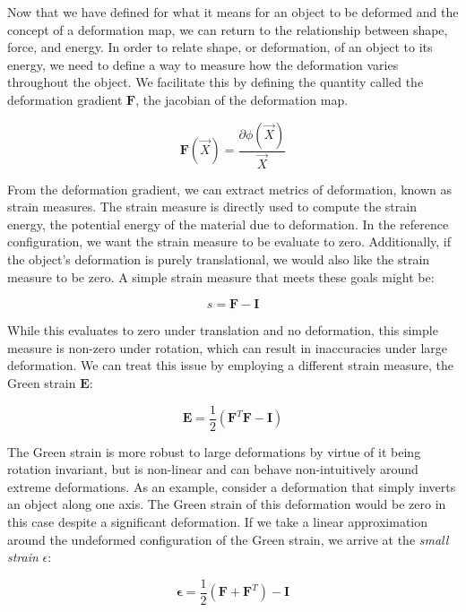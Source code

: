 Now that we have defined for what it means for an object to be
deformed and the concept of a deformation map, we can return to the
relationship between shape, force, and energy. In order to relate
shape, or deformation, of an object to its energy, we need to define a
way to measure how the deformation varies throughout the object. We
facilitate this by defining the quantity called the deformation
gradient $\mathbf F$, the jacobian of the deformation map.

\begin{equation}
  \label{equ:deformationgradient}
  \mathbf{F}(\vec{X}) = \frac{\partial \phi(
      \vec{X} )}{ \vec{X} }
\end{equation}

From the deformation gradient, we can extract metrics of deformation,
known as strain measures. The strain measure is directly used to
compute the strain energy, the potential energy of the material due to
deformation. In the reference configuration, we want the
strain measure to be evaluate to zero. Additionally, if the object's
deformation is purely translational, we would also like the strain
measure to be zero. A simple strain measure that meets these goals
might be:

\begin{equation}
  \label{equ:simplestrainmeasure}
  s = \mathbf F - \mathbf I
\end{equation}

While this evaluates to zero under translation and no deformation,
this simple measure is non-zero under rotation, which can result in
inaccuracies under large deformation. We can treat this issue by
employing a different strain measure, the Green strain $\mathbf{E}$:

\begin{equation}
  \label{equ:greenstrain}
  \mathbf{E} = \frac 1 2 (\mathbf{F}^T\mathbf{F}-\mathbf{I})
\end{equation}

The Green strain is more robust to large deformations by virtue of it
being rotation invariant, but is non-linear and can behave
non-intuitively around extreme deformations. As an example, consider a
deformation that simply inverts an object along one axis. The Green
strain of this deformation would be zero in this case despite a
significant deformation. If we take a linear approximation around the
undeformed configuration of the Green strain, we arrive at the
\textit{small strain} $\epsilon$:

\begin{equation}
  \label{equ:smallstrain}
  \bm{\epsilon} = \frac 1 2 (\mathbf{F} + \mathbf{F}^T) - \mathbf{I}
\end{equation}

